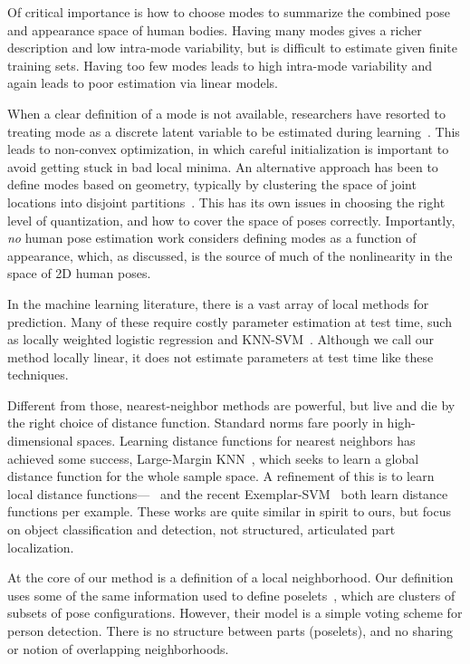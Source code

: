Of critical importance is how to choose modes to summarize the combined pose 
and appearance space of human bodies.  Having many modes gives a richer 
description and low intra-mode variability, but is difficult to estimate given 
finite training sets.  Having too few modes leads to high intra-mode 
variability and again leads to poor estimation via linear models. 

When a clear definition of a mode is not available, researchers have resorted 
to treating mode as a discrete latent variable to be estimated during 
learning~\citep{dpm,deva2011}.  This leads to non-convex optimization, in which 
careful initialization is important to avoid getting stuck in bad local minima.  
An alternative approach has been to define modes based on geometry, typically 
by clustering the space of joint locations into disjoint 
partitions~\citep{johnson11,wang2011}.  This has its own issues in choosing the 
right level of quantization, and how to cover the space of poses correctly.  
Importantly, {\em no} human pose estimation work considers defining modes as a 
function of appearance, which, as discussed, is the source of much of the 
nonlinearity in the space of 2D human poses. 

In the machine learning literature, there is a vast array of local methods for 
prediction.  Many of these require costly parameter estimation at test time, 
such as locally weighted logistic regression and KNN-SVM~\citep{zhang06}.  
Although we call our method locally linear, it does not estimate parameters at 
test time like these techniques.

Different from those, nearest-neighbor methods are powerful, but live and die 
by the right choice of distance function.  Standard norms fare poorly in 
high-dimensional spaces.  Learning distance functions for nearest neighbors has 
achieved some success, \eg Large-Margin KNN~\citep{lmknn}, which seeks to learn 
a global distance function for the whole sample space.  A refinement of this is 
to learn local distance functions---~\citep{frome07} and the recent 
Exemplar-SVM~\citep{esvm} both learn distance functions per example.  These 
works are quite similar in spirit to ours, but focus on object classification 
and detection, not structured, articulated part localization.

At the core of our method is a definition of a local neighborhood.  Our 
definition uses some of the same information used to define 
poselets~\citep{bourdev09}, which are clusters of subsets of pose 
configurations.  However, their model is a simple voting scheme for person 
detection.  There is no structure between parts (poselets), and no sharing or 
notion of overlapping neighborhoods.



